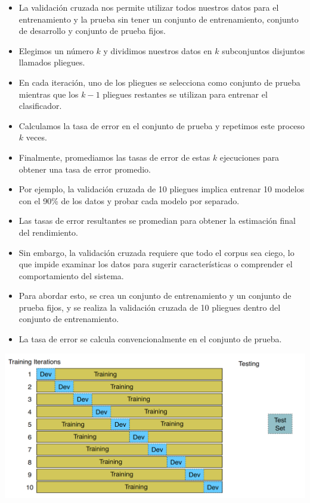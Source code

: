 \documentclass[11pt,fleqn]{book} %
\begin{document}
\begin{itemize}
\item La validación cruzada nos permite utilizar todos nuestros datos para el entrenamiento y la prueba sin tener un conjunto de entrenamiento, conjunto de desarrollo y conjunto de prueba fijos.
\item Elegimos un número $k$ y dividimos nuestros datos en $k$ subconjuntos disjuntos llamados pliegues.
\item En cada iteración, uno de los pliegues se selecciona como conjunto de prueba mientras que los $k-1$ pliegues restantes se utilizan para entrenar el clasificador.
\item Calculamos la tasa de error en el conjunto de prueba y repetimos este proceso $k$ veces.
\item Finalmente, promediamos las tasas de error de estas $k$ ejecuciones para obtener una tasa de error promedio.
\item Por ejemplo, la validación cruzada de 10 pliegues implica entrenar 10 modelos con el 90\% de los datos y probar cada modelo por separado.
\item Las tasas de error resultantes se promedian para obtener la estimación final del rendimiento.
\item Sin embargo, la validación cruzada requiere que todo el corpus sea ciego, lo que impide examinar los datos para sugerir características o comprender el comportamiento del sistema.
\item Para abordar esto, se crea un conjunto de entrenamiento y un conjunto de prueba fijos, y se realiza la validación cruzada de 10 pliegues dentro del conjunto de entrenamiento.
\item La tasa de error se calcula convencionalmente en el conjunto de prueba.
\end{itemize}


\begin{center}
\includegraphics[scale=0.28]{pics/cv.png}
\end{center}
\end{document}

